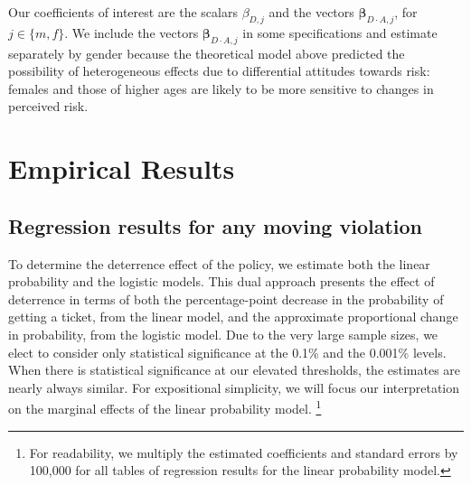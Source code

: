 \documentclass{cje}
\begin{document}
Our coefficients of interest are 
the scalars $\beta_{D,j}$ and the vectors $\bm{\beta}_{D\cdot A,j}$, 
for $j \in \{ m, f\}$. 
We include the vectors $\bm{\beta}_{D\cdot A,j}$ in some specifications 
and estimate separately by gender because the theoretical model 
above predicted the possibility of heterogeneous effects 
due to differential attitudes towards risk: 
females and those of higher ages are likely 
to be more sensitive to changes in perceived risk. 




\section{Empirical Results}
\label{sec:Empirical}


\subsection{Regression results for any moving violation}
\label{sec:Empirical_all}

To determine the deterrence effect of the policy, we estimate both the linear probability and the logistic models. 
% 
This dual approach presents the effect of deterrence in terms of 
both the percentage-point decrease in the probability of getting a ticket, 
from the linear model, 
and the approximate proportional change in probability, 
from the logistic model.  
%
Due to the very large sample sizes, 
we elect to consider only statistical significance at the 0.1\% and the 0.001\% levels. 
%
When there is statistical significance at our elevated thresholds, 
the estimates are nearly always similar. 
For expositional simplicity, we will focus our interpretation on 
the marginal effects of the linear probability model.%
\footnote{%
For readability, we multiply the estimated coefficients and standard errors by 100,000 
for all tables of regression results for the linear probability model. 
}
\end{document}
